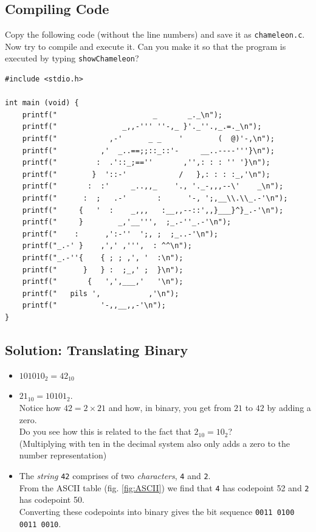 \subsection*{Compiling Code}
Copy the following code (without the line numbers) and save it as \texttt{chameleon.c}. Now try to compile and execute it. Can you make it so that the program is executed by typing \texttt{showChameleon}?

\begin{codebox}[chameleon.c]
\begin{verbatim}
#include <stdio.h>

int main (void) {
	printf("                      _       _._\n");
	printf("               _,,-''' ''-,_ }'._''.,_.=._\n");
	printf("            ,-'      _ _    '        (  @)'-,\n");
	printf("          ,'  _..==;;::_::'-     __..----'''}\n");
	printf("         :  .'::_;==''       ,'',: : : '' '}\n");
	printf("        }  '::-'            /   },: : : :_,'\n");
	printf("       :  :'     _..,,_    '., '._-,,,--\'    _\n");
	printf("      :  ;   .-'       :      '-, ';,__\\.\\_.-'\n");
	printf("     {   '  :    _,,,   :__,,--::',,}___}^}_.-'\n");
	printf("     }        _,'__''',  ;_.-''_.-'\n");
	printf("    :      ,':-''  ';, ;  ;_..-'\n");
	printf("_.-' }    ,',' ,''',  : ^^\n");
	printf("_.-''{    { ; ; ,', '  :\n");
	printf("      }   } :  ;_,' ;  }\n");
	printf("       {   ',',___,'   '\n");
	printf("   pils ',           ,'\n");
	printf("          '-,,__,,-'\n");
}
\end{verbatim}
\end{codebox}

\newpage

\subsection*{Solution: Translating Binary}
\begin{itemize}
\item $101010_2 = 42_{10}$
\item $21_{10} = 10101_2$. \\
	Notice how $42 = 2 \times 21$ and how, in binary, you get from $21$ to $42$ by adding a zero.\\
	Do you see how this is related to the fact that $2_{10} = 10_2$?\\
	(Multiplying with ten in the decimal system also only adds a zero to the number representation)
\item The \emph{string} \texttt{42} comprises of two \emph{characters}, \texttt{4} and \texttt{2}.\\
	From the ASCII table (fig. \ref{fig:ASCII}) we find that \texttt{4} has codepoint 52 and \texttt{2} has codepoint 50.\\
	Converting these codepoints into binary gives the bit sequence \texttt{0011 0100  0011 0010}.
\end{itemize}

